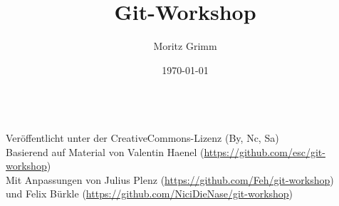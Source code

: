 \documentclass{beamer}
\date{\today}
\begin{document}

\begin{frame}
		\title{Git-Workshop}
		\author{Moritz Grimm}
		\date{}
		\titlepage
		\begin{center}
			\\
			\vspace{0.4cm}
			\tiny{Veröffentlicht unter der CreativeCommons-Lizenz (By, Nc, Sa)}\\
			\vspace{0.2cm}
			\tiny{Basierend auf Material von Valentin Haenel (\url{https://github.com/esc/git-workshop})}\\
			\vspace{0.2cm}
			\tiny{Mit Anpassungen von Julius Plenz (\url{https://github.com/Feh/git-workshop})}\\
			\vspace{0.2cm}
			\tiny{und Felix Bürkle (\url{https://github.com/NiciDieNase/git-workshop})}
		\end{center}
\end{frame}
\end{document}
